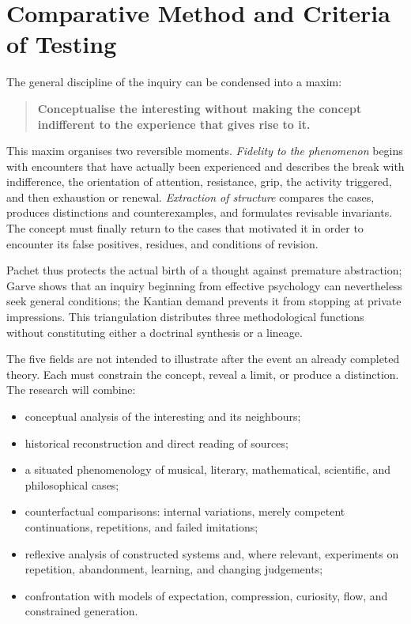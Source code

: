 \documentclass[11pt,a4paper]{article}
\begin{document}
\section{Comparative Method and Criteria of Testing}

The general discipline of the inquiry can be condensed into a maxim:

\begin{quote}
\textbf{Conceptualise the interesting without making the concept indifferent to
the experience that gives rise to it.}
\end{quote}

This maxim organises two reversible moments. \emph{Fidelity to the phenomenon}
begins with encounters that have actually been experienced and describes the
break with indifference, the orientation of attention, resistance, grip, the
activity triggered, and then exhaustion or renewal. \emph{Extraction of
structure} compares the cases, produces distinctions and counterexamples, and
formulates revisable invariants. The concept must finally return to the cases
that motivated it in order to encounter its false positives, residues, and
conditions of revision.

Pachet thus protects the actual birth of a thought against premature
abstraction; Garve shows that an inquiry beginning from effective psychology can
nevertheless seek general conditions; the Kantian demand prevents it from
stopping at private impressions. This triangulation distributes three
methodological functions without constituting either a doctrinal synthesis or a
lineage.

The five fields are not intended to illustrate after the event an already
completed theory. Each must constrain the concept, reveal a limit, or produce a
distinction. The research will combine:

\begin{itemize}
  \item conceptual analysis of the interesting and its neighbours;
  \item historical reconstruction and direct reading of sources;
  \item a situated phenomenology of musical, literary, mathematical,
        scientific, and philosophical cases;
  \item counterfactual comparisons: internal variations, merely competent
        continuations, repetitions, and failed imitations;
  \item reflexive analysis of constructed systems and, where relevant,
        experiments on repetition, abandonment, learning, and changing
        judgements;
  \item confrontation with models of expectation, compression, curiosity,
        flow, and constrained generation.
\end{itemize}
\end{document}
